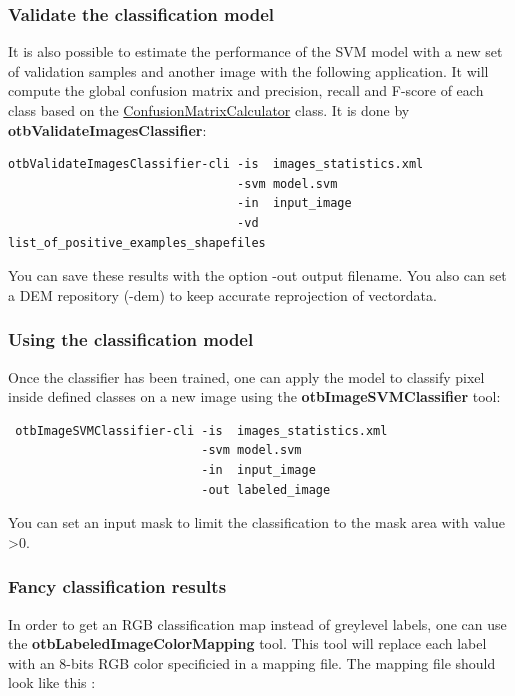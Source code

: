 \subsubsection{Validate the classification model}
It is also possible to estimate the performance of the SVM model with a new set of validation samples and another image with the following application.
It will compute the global confusion matrix and precision, recall and F-score of each class based on the \href{http://www.orfeo-toolbox.org/doxygen-current/classotb_1_1ConfusionMatrixCalculator.html}{ConfusionMatrixCalculator} class.
It is done by \textbf{otbValidateImagesClassifier}:

\begin{verbatim}
otbValidateImagesClassifier-cli -is  images_statistics.xml
                                -svm model.svm
                                -in  input_image
                                -vd  list_of_positive_examples_shapefiles
\end{verbatim}

You can save these results with the option -out output filename. You also can set a DEM repository (-dem) to keep accurate reprojection of vectordata.

\subsubsection{Using the classification model} 
Once the classifier has been trained, one can apply the model to classify pixel inside defined classes on a new image using the \textbf{otbImageSVMClassifier} tool:

\begin{verbatim}
 otbImageSVMClassifier-cli -is  images_statistics.xml
                           -svm model.svm 
                           -in  input_image
                           -out labeled_image
\end{verbatim}

You can set an input mask to limit the classification to the mask area with value \textgreater 0.

\subsubsection{Fancy classification results}

In order to get an RGB classification map instead of greylevel labels, one can use the \textbf{otbLabeledImageColorMapping} tool. This tool will replace each label with an 8-bits RGB color specificied in a mapping file. The mapping file should look like this :

